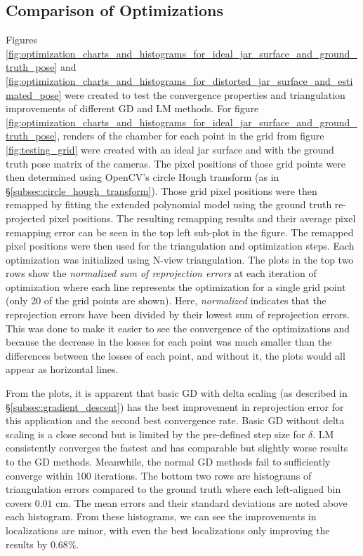 \documentclass[11pt, letterpaper]{extarticle} %
\begin{document}
\subsection{Comparison of Optimizations} \label{subsec:comparison_of_optimizations}
Figures \ref{fig:optimization_charts_and_histograms_for_ideal_jar_surface_and_ground_truth_pose} and \ref{fig:optimization_charts_and_histograms_for_distorted_jar_surface_and_estimated_pose} were created to test the convergence properties and triangulation improvements of different GD and LM methods. For figure \ref{fig:optimization_charts_and_histograms_for_ideal_jar_surface_and_ground_truth_pose}, renders of the chamber for each point in the grid from figure \ref{fig:testing_grid} were created with an ideal jar surface and with the ground truth pose matrix of the cameras. The pixel positions of those grid points were then determined using OpenCV's circle Hough transform (as in \S\ref{subsec:circle_hough_transform}). Those grid pixel positions were then remapped by fitting the extended polynomial model using the ground truth re-projected pixel positions. The resulting remapping results and their average pixel remapping error can be seen in the top left sub-plot in the figure. The remapped pixel positions were then used for the triangulation and optimization steps. Each optimization was initialized using N-view triangulation. The plots in the top two rows show the \textit{normalized sum of reprojection errors} at each iteration of optimization where each line represents the optimization for a single grid point (only 20 of the grid points are shown). Here, \textit{normalized} indicates that the reprojection errors have been divided by their lowest sum of reprojection errors. This was done to make it easier to see the convergence of the optimizations and because the decrease in the losses for each point was much smaller than the differences between the losses of each point, and without it, the plots would all appear as horizontal lines.

From the plots, it is apparent that basic GD with delta scaling (as described in \S\ref{subsec:gradient_descent}) has the best improvement in reprojection error for this application and the second best convergence rate. Basic GD without delta scaling is a close second but is limited by the pre-defined step size for $\delta$. LM consistently converges the fastest and has comparable but slightly worse results to the GD methods. Meanwhile, the normal GD methods fail to sufficiently converge within 100 iterations. The bottom two rows are histograms of triangulation errors compared to the ground truth where each left-aligned bin covers $0.01$ cm. The mean errors and their standard deviations are noted above each histogram. From these histograms, we can see the improvements in localizations are minor, with even the best localizations only improving the results by $0.68\%$.
\end{document}
